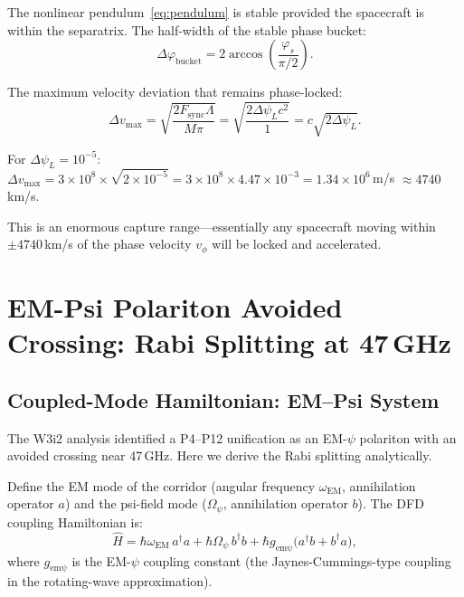 \documentclass[aps,prd,twocolumn,superscriptaddress]{revtex4-2}
\begin{document}
The nonlinear pendulum~\eqref{eq:pendulum} is stable provided the spacecraft
is within the separatrix.  The half-width of the stable phase bucket:
\begin{equation}
\Delta\varphi_\mathrm{bucket} = 2\arccos\!\left(\frac{\varphi_s}{\pi/2}\right).
\label{eq:bucket}
\end{equation}

The maximum velocity deviation that remains phase-locked:
\begin{equation}
\Delta v_\mathrm{max} = \sqrt{\frac{2F_\mathrm{sync}\Lambda}{M\pi}}
= \sqrt{\frac{2\Delta\psi_L c^2}{1}}
= c\sqrt{2\Delta\psi_L}.
\label{eq:Deltav_max}
\end{equation}

For $\Delta\psi_L = 10^{-5}$: $\Delta v_\mathrm{max} = 3\times10^8\times\sqrt{2\times10^{-5}}
= 3\times10^8\times4.47\times10^{-3} = 1.34\times10^6$\,m/s $\approx 4740$\,km/s.

This is an enormous capture range---essentially any spacecraft moving
within $\pm 4740$\,km/s of the phase velocity $v_\phi$ will be locked
and accelerated.

\section{EM-Psi Polariton Avoided Crossing: Rabi Splitting at 47\,GHz}
\label{sec:polariton}

\subsection{Coupled-Mode Hamiltonian: EM--Psi System}

The W3i2 analysis identified a P4--P12 unification as an EM-$\psi$
polariton with an avoided crossing near 47\,GHz.  Here we derive
the Rabi splitting analytically.

Define the EM mode of the corridor (angular frequency $\omega_\mathrm{EM}$,
annihilation operator $a$) and the psi-field mode ($\Omega_\psi$,
annihilation operator $b$).  The DFD coupling Hamiltonian is:
\begin{equation}
\hat{H} = \hbar\omega_\mathrm{EM}\,a^\dagger a
+ \hbar\Omega_\psi\,b^\dagger b
+ \hbar g_\mathrm{em\psi}\bigl(a^\dagger b + b^\dagger a\bigr),
\label{eq:jaynes_cummings}
\end{equation}
where $g_\mathrm{em\psi}$ is the EM-$\psi$ coupling constant (the
Jaynes-Cummings-type coupling in the rotating-wave approximation).
\end{document}
